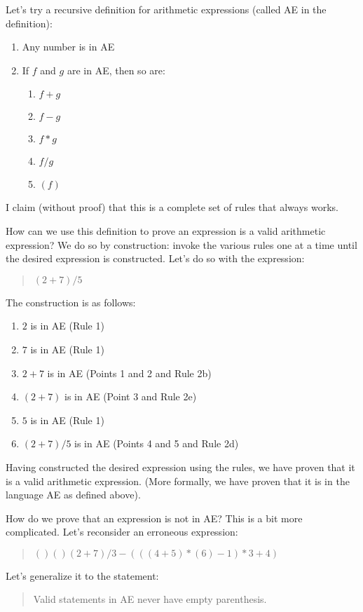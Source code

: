 \documentclass[letterpaper,12pt,openany,reqno]{book}%
\begin{document}
Let's try a recursive definition for arithmetic expressions (called AE in the definition):

\begin{enumerate}
\item Any number is in AE
\item If $f$ and $g$ are in AE, then so are:
\begin{enumerate}
\item $f + g$
\item $f - g$
\item $f * g$
\item $f / g$
\item $(f)$
\end{enumerate}
\end{enumerate}
I claim (without proof) that this is a complete set of rules that always works.

How can we use this definition to prove an expression is a valid arithmetic expression? We do so by construction: invoke the various rules one at a time until the desired expression is constructed. Let's do so with the expression:
\begin{quote}
$(2+7)/5$
\end{quote}
The construction is as follows:
\begin{enumerate}
\item $2$ is in AE (Rule 1)
\item $7$ is in AE (Rule 1)
\item $2+7$ is in AE (Points 1 and 2 and Rule 2b)
\item $(2+7)$ is in AE (Point 3 and Rule 2e)
\item $5$ is in AE (Rule 1)
\item $(2+7)/5$ is in AE (Points 4 and 5 and Rule 2d)
\end{enumerate}
Having constructed the desired expression using the rules, we have proven that it is a valid arithmetic expression. (More formally, we have proven that it is in the language AE as defined above).

How do we prove that an expression is not in AE? This is a bit more complicated. Let's reconsider an erroneous expression:
\begin{quote}
$()()(2+7)/3-(((4+5)*(6)-1)*3 + 4)$
\end{quote}
Let's generalize it to the statement:
\begin{quote}
Valid statements in AE never have empty parenthesis.
\end{quote}
\end{document}
